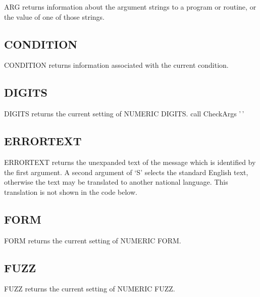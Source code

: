ARG returns information about the argument strings to a program or
routine, or the value of one of those strings.



\subsection{CONDITION}\label{condition}

CONDITION returns information associated with the current condition.



\subsection{DIGITS}\label{digits}

DIGITS returns the current setting of NUMERIC DIGITS. call CheckArgs
'\,'



\subsection{ERRORTEXT}\label{errortext}

ERRORTEXT returns the unexpanded text of the message which is identified
by the first argument. A second argument of `S' selects the standard
English text, otherwise the text may be translated to another national
language. This translation is not shown in the code below.



\subsection{FORM}\label{form}

FORM returns the current setting of NUMERIC FORM.



\subsection{FUZZ}\label{fuzz}

FUZZ returns the current setting of NUMERIC FUZZ.

